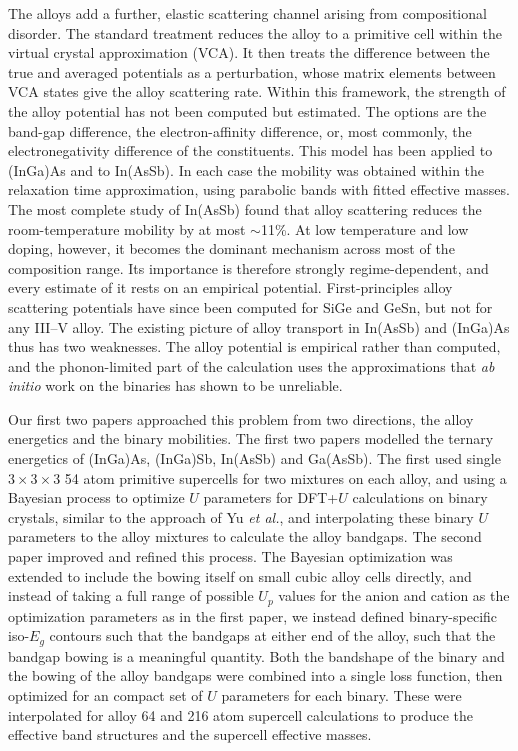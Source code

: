 \documentclass[aps,prmaterials,reprint,amsmath,amssymb,superscriptaddress]{revtex4-2}
\begin{document}
The alloys add a further, elastic scattering channel arising from compositional disorder. The standard treatment reduces the alloy to a primitive cell within the virtual crystal approximation (VCA)\cite{VCA1_Nordheim1931,VCA_alloycorr1}. It then treats the difference between the true and averaged potentials as a perturbation, whose matrix elements between VCA states give the alloy scattering rate\cite{Harrison1976}. Within this framework, the strength of the alloy potential has not been computed but estimated. The options are the band-gap difference, the electron-affinity difference, or, most commonly, the electronegativity difference of the constituents\cite{Phillips1970}. This model has been applied to (InGa)As\cite{Littlejohn1978} and to In(AsSb)\cite{Chin1991,Egan1994}. In each case the mobility was obtained within the relaxation time approximation, using parabolic bands with fitted effective masses. The most complete study of In(AsSb)\cite{Chin1991} found that alloy scattering reduces the room-temperature mobility by at most $\sim$11\%. At low temperature and low doping, however, it becomes the dominant mechanism across most of the composition range. Its importance is therefore strongly regime-dependent, and every estimate of it rests on an empirical potential. First-principles alloy scattering potentials have since been computed for SiGe\cite{MurphyArmando2006,MurphyArmando2008} and GeSn\cite{Sewell2024}, but not for any III--V alloy. The existing picture of alloy transport in In(AsSb) and (InGa)As thus has two weaknesses. The alloy potential is empirical rather than computed, and the phonon-limited part of the calculation uses the approximations that \textit{ab initio} work on the binaries has shown to be unreliable.

Our first two papers approached this problem from two directions, the alloy energetics and the binary mobilities. The first two papers modelled the ternary energetics of (InGa)As, (InGa)Sb, In(AsSb) and Ga(AsSb)\cite{Gentles2024,Gentles2026a}. The first used single $3 \times 3 \times 3$ 54 atom primitive supercells for two mixtures on each alloy, and using a Bayesian process to optimize $U$ parameters for DFT+$U$ calculations on binary crystals\cite{DFTU_Dudarev}, similar to the approach of Yu \textit{et al.}\cite{Yu2020_dftu}, and interpolating these binary $U$ parameters to the alloy mixtures to calculate the alloy bandgaps. The second paper improved and refined this process. The Bayesian optimization was extended to include the bowing itself on small cubic alloy cells directly, and instead of taking a full range of possible $U_p$ values for the anion and cation as the optimization parameters as in the first paper, we instead defined binary-specific iso-$E_g$ contours such that the bandgaps at either end of the alloy, such that the bandgap bowing is a meaningful quantity. Both the bandshape of the binary and the bowing of the alloy bandgaps were combined into a single loss function, then optimized for an compact set of $U$ parameters for each binary. These were interpolated for alloy 64 and 216 atom supercell calculations to produce the effective band structures\cite{EBS_Popescu2010} and the supercell effective masses.
\end{document}
